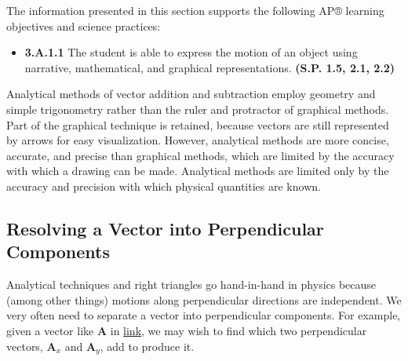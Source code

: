 \documentclass[
]{book}
\providecommand{\tightlist}{%
  \setlength{\itemsep}{0pt}\setlength{\parskip}{0pt}}
\begin{document}
The information presented in this section supports the following AP®
learning objectives and science practices:

\begin{itemize}
\tightlist
\item
  \textbf{3.A.1.1} The student is able to express the motion of an object
  using narrative, mathematical, and graphical representations.
  \textbf{(S.P. 1.5, 2.1, 2.2)}
\end{itemize}

\protect\hypertarget{import-auto-id1165298770648}{}{Analytical methods} of
vector addition and subtraction employ geometry and simple trigonometry
rather than the ruler and protractor of graphical methods. Part of the
graphical technique is retained, because vectors are still represented
by arrows for easy visualization. However, analytical methods are more
concise, accurate, and precise than graphical methods, which are limited
by the accuracy with which a drawing can be made. Analytical methods are
limited only by the accuracy and precision with which physical
quantities are known.

\hypertarget{fs-id1472855}{}
\hypertarget{resolving-a-vector-into-perpendicular-components}{%
\subsection{Resolving a Vector into Perpendicular Components}\label{resolving-a-vector-into-perpendicular-components}}

Analytical techniques and right triangles go hand-in-hand in physics
because (among other things) motions along perpendicular directions are
independent. We very often need to separate a vector into perpendicular
components. For example, given a vector like \(\mathbf{A}{}\) in
\protect\hyperlink{import-auto-id1165298677803}{link}, we may
wish to find which two perpendicular vectors, \(\mathbf{A}_{x}{}\) and
\(\mathbf{A}_{y}{}\), add to produce it.
\end{document}
